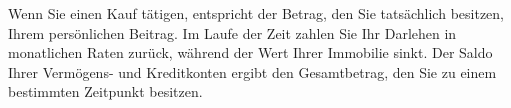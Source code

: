 Wenn Sie einen Kauf tätigen, entspricht der Betrag, den Sie tatsächlich besitzen, Ihrem persönlichen Beitrag. Im Laufe der Zeit zahlen Sie Ihr Darlehen in monatlichen Raten zurück, während der Wert Ihrer Immobilie sinkt. Der Saldo Ihrer Vermögens- und Kreditkonten ergibt den Gesamtbetrag, den Sie zu einem bestimmten Zeitpunkt besitzen.


